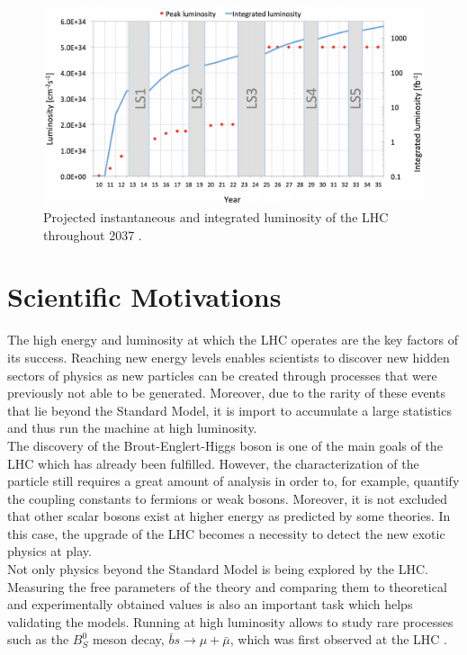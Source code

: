     \begin{figure}[h!]
      \centering
      \includegraphics[width=\textwidth]{img/I-2-LHC/lhc-schedule.png}
      \caption{Projected instantaneous and integrated luminosity of the LHC throughout 2037 \cite{HOME-CERN}.}
      \label{fig:I-2-future}
    \end{figure}

  \section{Scientific Motivations}

    The high energy and luminosity at which the LHC operates are the key factors of its success. Reaching new energy levels enables scientists to discover new hidden sectors of physics as new particles can be created through processes that were previously not able to be generated. Moreover, due to the rarity of these events that lie beyond the Standard Model, it is import to accumulate a large statistics and thus run the machine at high luminosity. \\

    The discovery of the Brout-Englert-Higgs boson is one of the main goals of the LHC which has already been fulfilled. However, the characterization of the particle still requires a great amount of analysis in order to, for example, quantify the coupling constants to fermions or weak bosons. Moreover, it is not excluded that other scalar bosons exist at higher energy as predicted by some theories. In this case, the upgrade of the LHC becomes a necessity to detect the new exotic physics at play. \\

    Not only physics beyond the Standard Model is being explored by the LHC. Measuring the free parameters of the theory and comparing them to theoretical and experimentally obtained values is also an important task which helps validating the models. Running at high luminosity allows to study rare processes such as the $ B^0_S $ meson decay, $ \bar{b}s \rightarrow \mu + \bar{\mu} $, which was first observed at the LHC \cite{b0smumu}. \\

